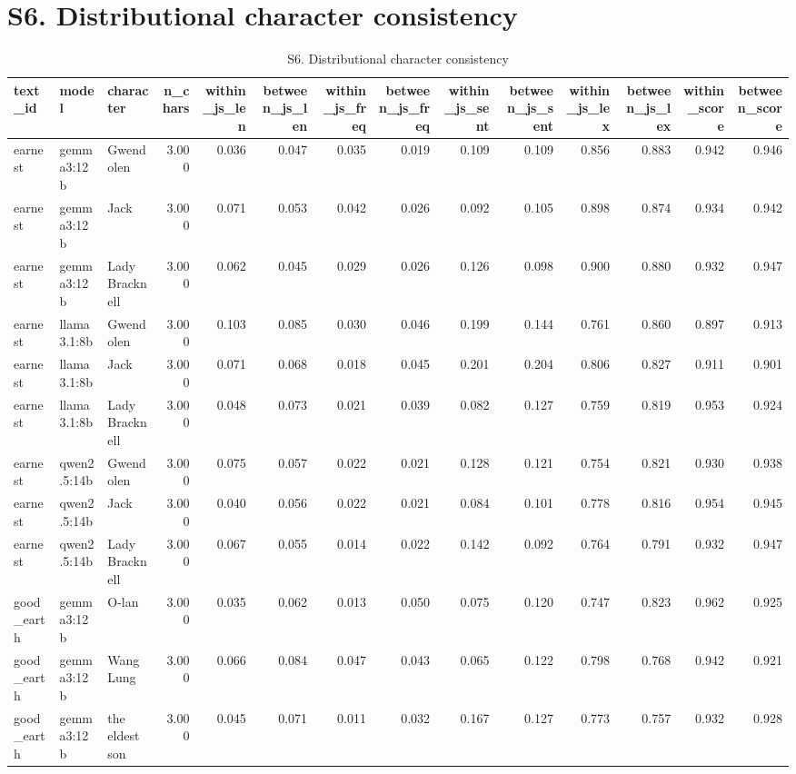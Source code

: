 \documentclass[10pt]{article}
\begin{document}
\section*{S6. Distributional character consistency}

{\scriptsize
\begin{longtable}{lllrrrrrrrrrrr}
\caption{S6. Distributional character consistency}\\
\toprule
text\_id & model & character & n\_chars & within\_js\_len & between\_js\_len & within\_js\_freq & between\_js\_freq & within\_js\_sent & between\_js\_sent & within\_js\_lex & between\_js\_lex & within\_score & between\_score \\
\midrule
\endhead
earnest & gemma3:12b & Gwendolen & 3.000 & 0.036 & 0.047 & 0.035 & 0.019 & 0.109 & 0.109 & 0.856 & 0.883 & 0.942 & 0.946 \\
earnest & gemma3:12b & Jack & 3.000 & 0.071 & 0.053 & 0.042 & 0.026 & 0.092 & 0.105 & 0.898 & 0.874 & 0.934 & 0.942 \\
earnest & gemma3:12b & Lady Bracknell & 3.000 & 0.062 & 0.045 & 0.029 & 0.026 & 0.126 & 0.098 & 0.900 & 0.880 & 0.932 & 0.947 \\
earnest & llama3.1:8b & Gwendolen & 3.000 & 0.103 & 0.085 & 0.030 & 0.046 & 0.199 & 0.144 & 0.761 & 0.860 & 0.897 & 0.913 \\
earnest & llama3.1:8b & Jack & 3.000 & 0.071 & 0.068 & 0.018 & 0.045 & 0.201 & 0.204 & 0.806 & 0.827 & 0.911 & 0.901 \\
earnest & llama3.1:8b & Lady Bracknell & 3.000 & 0.048 & 0.073 & 0.021 & 0.039 & 0.082 & 0.127 & 0.759 & 0.819 & 0.953 & 0.924 \\
earnest & qwen2.5:14b & Gwendolen & 3.000 & 0.075 & 0.057 & 0.022 & 0.021 & 0.128 & 0.121 & 0.754 & 0.821 & 0.930 & 0.938 \\
earnest & qwen2.5:14b & Jack & 3.000 & 0.040 & 0.056 & 0.022 & 0.021 & 0.084 & 0.101 & 0.778 & 0.816 & 0.954 & 0.945 \\
earnest & qwen2.5:14b & Lady Bracknell & 3.000 & 0.067 & 0.055 & 0.014 & 0.022 & 0.142 & 0.092 & 0.764 & 0.791 & 0.932 & 0.947 \\
good\_earth & gemma3:12b & O-lan & 3.000 & 0.035 & 0.062 & 0.013 & 0.050 & 0.075 & 0.120 & 0.747 & 0.823 & 0.962 & 0.925 \\
good\_earth & gemma3:12b & Wang Lung & 3.000 & 0.066 & 0.084 & 0.047 & 0.043 & 0.065 & 0.122 & 0.798 & 0.768 & 0.942 & 0.921 \\
good\_earth & gemma3:12b & the eldest son & 3.000 & 0.045 & 0.071 & 0.011 & 0.032 & 0.167 & 0.127 & 0.773 & 0.757 & 0.932 & 0.928 \\

\end{longtable}}
\end{document}
